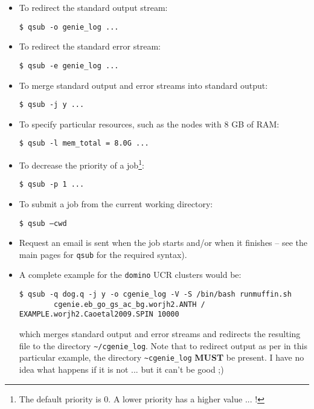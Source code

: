 \documentclass[11pt,fleqn]{book} %
\begin{document}
\begin{itemize}[noitemsep]
\setlength{\itemindent}{.2in}

        \item To redirect the standard output stream:
        \vspace{-2pt}\begin{verbatim}$ qsub -o genie_log ...\end{verbatim}
        
        \item To redirect the standard error stream:
        \vspace{-2pt}\begin{verbatim}$ qsub -e genie_log ...\end{verbatim}
        
        \item To merge standard output and error streams into standard output:
        \vspace{-2pt}\begin{verbatim}$ qsub -j y ...\end{verbatim}
        
        \item To specify particular resources, such as the nodes with 8 GB of RAM:
        \vspace{-2pt}\begin{verbatim}$ qsub -l mem_total = 8.0G ...\end{verbatim}
        
        \item To decrease the priority of a job\footnote{The default priority is 0. A lower priority has a higher value ... !}:
        \vspace{-2pt}\begin{verbatim}$ qsub -p 1 ...\end{verbatim}
        
        \item To submit a job from the current working directory:
        \vspace{-2pt}\begin{verbatim}$ qsub –cwd\end{verbatim}
        
        \item Request an email is sent when the job starts and/or when it finishes -- see the main pages for \texttt{qsub} for the required syntax).
        
        \item A complete example for the \texttt{domino} UCR clusters would be:
\small
        \vspace{-2pt}\begin{verbatim}$ qsub -q dog.q -j y -o cgenie_log -V -S /bin/bash runmuffin.sh
        cgenie.eb_go_gs_ac_bg.worjh2.ANTH / EXAMPLE.worjh2.Caoetal2009.SPIN 10000\end{verbatim}
\normalsize
        which merges standard output and error streams and redirects the resulting file to the directory \texttt{\~{}/cgenie\_log}.
        Note that to redirect output as per in this particular example, the directory \texttt{\~{}cgenie\_log} \textbf{MUST} be present. I have no idea what happens if it is not ... but it can't be good ;)
        

\end{itemize}
\end{document}
